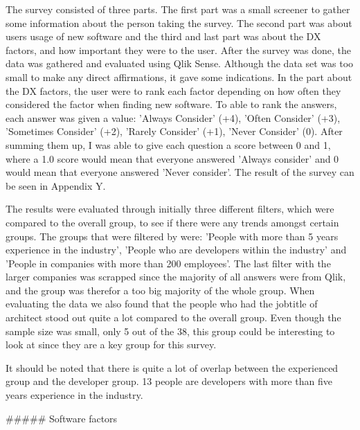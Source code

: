 \documentclass[11pt]{article}
\begin{document}
\begin{multicols}{2}

    The survey consisted of three parts. The first part was a small screener
    to gather some information about the person taking the survey. The
    second part was about users usage of new software and the third and last
    part was about the DX factors, and how important they were to the user.
    After the survey was done, the data was gathered and evaluated using
    Qlik Sense. Although the data set was too small to make any direct
    affirmations, it gave some indications. In the part about the DX
    factors, the user were to rank each factor depending on how often they
    considered the factor when finding new software. To able to rank the
    answers, each answer was given a value: 'Always Consider' (+4), 'Often
    Consider' (+3), 'Sometimes Consider' (+2), 'Rarely Consider' (+1),
    'Never Consider' (0). After summing them up, I was able to give each
    question a score between 0 and 1, where a 1.0 score would mean that
    everyone answered 'Always consider' and 0 would mean that everyone
    answered 'Never consider'. The result of the survey can be seen in
    Appendix Y.


    The results were evaluated through initially three different filters,
    which were compared to the overall group, to see if there were any
    trends amongst certain groups. The groups that were filtered by were:
    'People with more than 5 years experience in the industry', 'People who
    are developers within the industry' and 'People in companies with more
    than 200 employees'. The last filter with the larger companies was
    scrapped since the majority of all answers were from Qlik, and the group
    was therefor a too big majority of the whole group. When evaluating the
    data we also found that the people who had the jobtitle of architect
    stood out quite a lot compared to the overall group. Even though the
    sample size was small, only 5 out of the 38, this group could be
    interesting to look at since they are a key group for this survey.

    It should be noted that there is quite a lot of overlap between the
    experienced group and the developer group. 13 people are developers with
    more than five years experience in the industry.

    ##### Software factors


\end{multicols}
\end{document}
